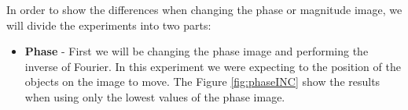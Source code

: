 \documentclass[12pt,a4paper]{article}
\begin{document}
In order to show the differences when changing the phase or magnitude image, we will divide the experiments into two parts:

\begin{itemize}
	\item \textbf{Phase} - First we will be changing the phase image and performing the inverse of Fourier. In this experiment we were expecting to the position of the objects on the image to move. The Figure \ref{fig:phaseINC} show the results when using only the lowest values of the phase image.

	\begin{figure}[!h]
		\centering
		\quad
\end{figure}
\end{itemize}
\end{document}
